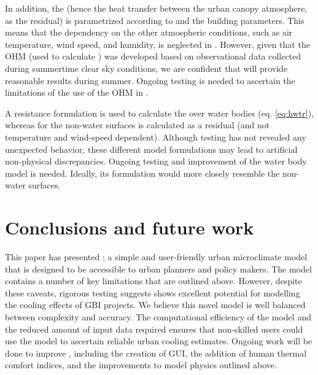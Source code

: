 \documentclass[final,3p,times,authoryear]{elsarticle}
\begin{document}
In addition, 
the  (hence the heat transfer between the urban canopy  atmosphere, as the residual) is parametrized according to  and the building parameters. This means that the dependency on the other atmospheric conditions, such as air temperature, wind speed, and humidity, is neglected in . However, given that the OHM  (used to calculate ) was developed based on observational data collected during summertime clear sky conditions, we are confident that  will provide reasonable results during summer. Ongoing testing is needed to ascertain the limitations of the use of the OHM in . 

A resistance formulation  is used to calculate the  over water bodies (eq. \ref{eq:hwtr}), whereas  for the non-water surfaces is calculated as a residual (and not temperature and wind-speed dependent). Although testing has not revealed any  unexpected behavior, these different model formulations may  lead to artificial non-physical discrepancies. Ongoing testing and improvement of the water body model is needed. Ideally, its formulation would more closely resemble the non-water surfaces. 

\section{Conclusions and future work}\label{sec:conclusion}

This paper has presented ; a simple and user-friendly urban microclimate model that is designed to be accessible to urban planners and policy makers. The model contains a number of key limitations that are outlined above. However, despite these caveats, rigorous testing suggests  shows excellent potential for modelling the cooling effects of GBI projects. We believe this novel model is well balanced between  complexity and accuracy. The computational efficiency of the model and the reduced amount of input data required ensures that non-skilled users could use the model to ascertain reliable urban cooling estimates. Ongoing work will be done to improve , including the creation of GUI, the addition of human thermal comfort indices, and the improvements to model physics outlined above. 
\end{document}
